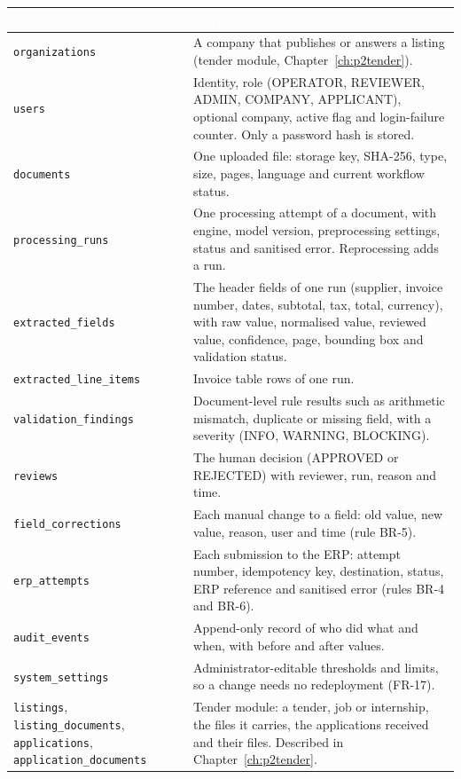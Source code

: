 \documentclass[11pt,a4paper]{report}
\newcommand{\hdr}[1]{\textcolor{white}{\sffamily\bfseries #1}}
\newcommand{\tblstart}{\rowcolors{2}{white}{rowgray}\arrayrulecolor{teal!60}}
\newcommand{\hdrrow}{\rowcolor{navy}}
\begin{document}
{\tblstart\small
\begin{longtable}{L{3.6cm}L{10.2cm}}
\hdrrow \hdr{Table} & \hdr{Purpose}\\ \endhead
\texttt{organizations} & A company that publishes or answers a listing (tender module, Chapter~\ref{ch:p2tender}).\\
\texttt{users} & Identity, role (OPERATOR, REVIEWER, ADMIN, COMPANY, APPLICANT), optional company, active flag and login-failure counter. Only a password hash is stored.\\
\texttt{documents} & One uploaded file: storage key, SHA-256, type, size, pages, language and current workflow status.\\
\texttt{processing\_runs} & One processing attempt of a document, with engine, model version, preprocessing settings, status and sanitised error. Reprocessing adds a run.\\
\texttt{extracted\_fields} & The header fields of one run (supplier, invoice number, dates, subtotal, tax, total, currency), with raw value, normalised value, reviewed value, confidence, page, bounding box and validation status.\\
\texttt{extracted\_line\_items} & Invoice table rows of one run.\\
\texttt{validation\_findings} & Document-level rule results such as arithmetic mismatch, duplicate or missing field, with a severity (INFO, WARNING, BLOCKING).\\
\texttt{reviews} & The human decision (APPROVED or REJECTED) with reviewer, run, reason and time.\\
\texttt{field\_corrections} & Each manual change to a field: old value, new value, reason, user and time (rule BR-5).\\
\texttt{erp\_attempts} & Each submission to the ERP: attempt number, idempotency key, destination, status, ERP reference and sanitised error (rules BR-4 and BR-6).\\
\texttt{audit\_events} & Append-only record of who did what and when, with before and after values.\\
\texttt{system\_settings} & Administrator-editable thresholds and limits, so a change needs no redeployment (FR-17).\\
\texttt{listings}, \texttt{listing\_documents}, \texttt{applications}, \texttt{application\_documents} & Tender module: a tender, job or internship, the files it carries, the applications received and their files. Described in Chapter~\ref{ch:p2tender}.\\
\hline
\end{longtable}}
\end{document}
